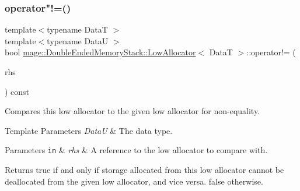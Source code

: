 \subsubsection{\texorpdfstring{operator"!=()}{operator!=()}}
{\footnotesize\ttfamily template$<$typename DataT $>$ \\
template$<$typename DataU $>$ \\
bool \hyperlink{classmage_1_1_double_ended_memory_stack_1_1_low_allocator}{mage\+::\+Double\+Ended\+Memory\+Stack\+::\+Low\+Allocator}$<$ DataT $>$\+::operator!= (\begin{DoxyParamCaption}\item[{const \hyperlink{classmage_1_1_double_ended_memory_stack_1_1_low_allocator}{Low\+Allocator}$<$ DataU $>$ \&}]{rhs }\end{DoxyParamCaption}) const\hspace{0.3cm}{\ttfamily [noexcept]}}

Compares this low allocator to the given low allocator for non-\/equality.


\begin{DoxyTemplParams}{Template Parameters}
{\em DataU} & The data type. \\
\hline
\end{DoxyTemplParams}

\begin{DoxyParams}[1]{Parameters}
\mbox{\tt in}  & {\em rhs} & A reference to the low allocator to compare with. \\
\hline
\end{DoxyParams}
\begin{DoxyReturn}{Returns}
{\ttfamily true} if and only if storage allocated from this low allocator cannot be deallocated from the given low allocator, and vice versa. {\ttfamily false} otherwise. 
\end{DoxyReturn}
\hypertarget{classmage_1_1_double_ended_memory_stack_1_1_low_allocator_a0b981bfb43cb094ba5d2bc02fcbcf2f5}{}\label{classmage_1_1_double_ended_memory_stack_1_1_low_allocator_a0b981bfb43cb094ba5d2bc02fcbcf2f5} 
